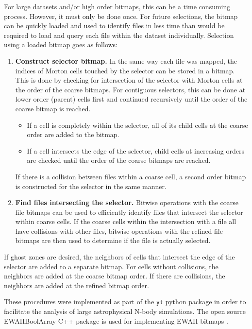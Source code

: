 \documentclass[apjl]{emulateapj}
\newcommand{\todo}[1]{{\color{red}{#1}}}
\begin{document}
For large datasets and/or high order bitmaps, this can be a time consuming process. However, it must only be done once. For future selections, the bitmap can be quickly loaded and used to identify files in less time than would be required to load and query each file within the dataset individually. Selection using a loaded bitmap goes as follows:
\begin{enumerate}
\item {\bf Construct selector bitmap.} In the same way each file was mapped, the indices of Morton cells touched by the selector can be stored in a bitmap. This is done by checking for intersection of the selector with Morton cells at the order of the coarse bitmaps. For contiguous selectors, this can be done at lower order (parent) cells first and continued recursively until the order of the coarse bitmap is reached. 
\begin{itemize}
\item If a cell is completely within the selector, all of its child cells at the coarse order are added to the bitmap. 
\item If a cell intersects the edge of the selector, child cells at increasing orders are checked until the order of the coarse bitmaps are reached. 
\end{itemize}
If there is a collision between files within a coarse cell, a second order bitmap is constructed for the selector in the same manner.
\item {\bf Find files intersecting the selector.} Bitwise operations with the coarse file bitmaps can be used to efficiently identify files that intersect the selector within coarse cells. If the coarse cells within the intersection with a file all have collisions with other files, bitwise operations with the refined file bitmaps are then used to determine if the file is actually selected.
\end{enumerate}

If ghost zones are desired, the neighbors of cells that intersect the edge of the selector are added to a separate bitmap. For cells without collisions, the neighbors are added at the coarse bitmap order. If there are collisions, the neighbors are added at the refined bitmap order.

These procedures were implemented as part of the {\tt yt} python package \citep{Turk20d11a} in order to facilitate the analysis of large astrophysical N-body simulations. The open source EWAHBoolArray C++ package is used for implementing EWAH bitmaps \citep{Lemire2010,Kaser2016}.
\todo{more/separate code section...?}
\end{document}
